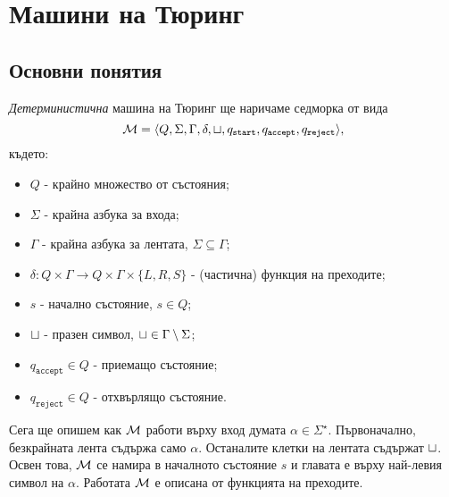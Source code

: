 \chapter{Машини на Тюринг}

\newcommand{\tape}[1]{\dots\blank\blank\blank{#1}\blank\blank\blank\dots}
\newcommand{\qaccept}{q_{\texttt{accept}}}
\newcommand{\qreject}{q_{\texttt{reject}}}



\section{Основни понятия}

{\em Детерминистична} машина на Тюринг ще наричаме седморка от вида 
\[\M = \TM,\] където:
\begin{itemize}
\item 
  $Q$ - крайно множество от състояния;
\item
  $\Sigma$ - крайна азбука за входа;
\item
  $\Gamma$ - крайна азбука за лентата, $\Sigma \subseteq \Gamma$;
\item
  $\delta:Q\times\Gamma \to Q\times \Gamma \times \{L,R,S\}$ - (частична) функция на преходите;
\item
  $s$ - начално състояние, $s \in Q$;
\item
  $\sqcup$ - празен символ,  $\sqcup \in \Gamma \setminus \Sigma$;
\item
  $\qaccept \in Q$ - приемащо състояние;
\item
  \marginpar{$\qaccept \neq \qreject$}
  $\qreject \in Q$ - отхвърлящо състояние.
\end{itemize}

Сега ще опишем как $\mathcal{M}$ работи върху вход думата $\alpha \in \Sigma^\star$.
Първоначално, безкрайната лента съдържа само $\alpha$. Останалите клетки на лентата съдържат $\sqcup$.
Освен това, $\mathcal{M}$ се намира в началното състояние $s$ и главата е върху най-левия символ на $\alpha$.
Работата $\mathcal{M}$ е описана от функцията на преходите.
  
